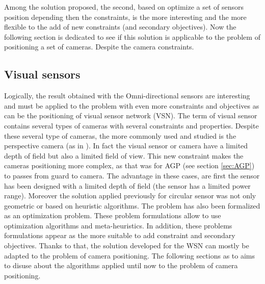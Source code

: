 Among the solution proposed, the second, based on optimize a set of sensors position  depending then  the constraints, is the more interesting and the more flexible to the add of new constraints (and secondary objectives). 
Now the following section  is dedicated to see if this solution is applicable to the problem of positioning a set of cameras. Despite the camera constraints.

	\subsection{Visual sensors}
	
Logically, the result obtained with the Omni-directional sensors are interesting and must be applied to the problem with even more constraints and objectives as can be the positioning of visual sensor network (VSN). The term of  visual sensor contains several types of cameras with several constraints and properties. Despite these several type of cameras, the more commonly used and studied is the perspective camera (as in \citep{149*mavrinac2013,174*zhang2016,193*fu2014,42*bulusu2001}). 
  In fact the visual sensor or camera have a limited depth of field but also a limited field of view. This new constraint makes the cameras positioning more complex, as that was for AGP (see section \ref{sec:AGP}) to passes from guard to camera.
 The advantage in these cases, are first the sensor has been designed with a limited depth of field (the sensor has a limited power range). 
 Moreover the solution applied previously for circular sensor was not only geometric or based on heuristic algorithms. The problem has also been formalized as an optimization problem. These problem formulations allow to use optimization algorithms and meta-heuristics. In addition, these problems formulations appear as the more suitable to add constraint and secondary objectives. Thanks to that, the solution  developed for the WSN can mostly be adapted to the problem of camera positioning. 
 The following sections as to aims to disuse about the algorithms applied until now to the problem of camera positioning.
  

